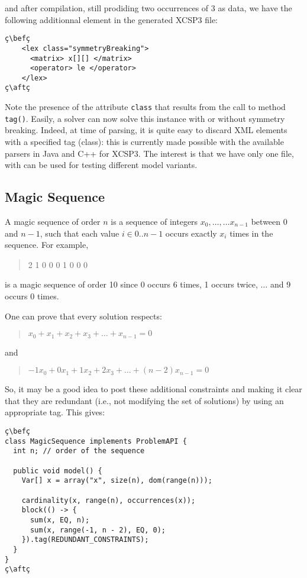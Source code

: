 \documentclass[10pt]{article}
\def\xt{{\rm XCSP3}\xspace}
\newcommand{\nn}[1]{{\tt #1}} %
\def\xt{{\rm XCSP3}\xspace}
\newenvironment{myvb}{\endgraf\small\verbatim}{\endverbatim}
\def\bef{\rule{10cm}{0.1mm}} %
\def\aft{\rule{10cm}{0.1mm}\medskip}
\begin{document}
and after compilation, still prodiding two occurrences of 3 as data, we have the following additionnal element in the generated \xt file:

\begin{lstlisting}
ç\befç
    <lex class="symmetryBreaking">
      <matrix> x[][] </matrix>
      <operator> le </operator>
    </lex>
ç\aftç
\end{lstlisting}


Note the presence of the attribute \nn{class} that results from the call to method \nn{tag()}.
Easily, a solver can now solve this instance with or without symmetry breaking.
Indeed, at time of parsing, it is quite easy to discard XML elements with a specified tag (class): this is currently made possible with the available parsers in Java and C++ for \xt.
The interest is that we have only one file, with can be used for testing different model variants. 


\subsection{Magic Sequence}

A magic sequence of order $n$ is a sequence of integers $x_0,\dots,…x_{n-1}$ between 0 and $n-1$, such that each value $i \in 0..n−1$ occurs exactly $x_i$ times in the sequence.
For example,
\begin{quote}
\begin{myvb}
  6 2 1 0 0 0 1 0 0 0
\end{myvb}
\end{quote}
is a magic sequence of order 10 since 0 occurs 6 times, 1 occurs twice, $\dots$ and 9 occurs 0 times.

One can prove that every solution respects:
\begin{quote}
  $x_0 + x_1 + x_2 + x_3 + \dots + x_{n-1} = 0$
\end{quote}
and
\begin{quote}
  $-1x_0 + 0x_1 + 1x_2 + 2x_3 + \dots + (n-2)x_{n-1} = 0$
\end{quote}

So, it may be a good idea to post these additional constraints  and making it clear that they are redundant (i.e., not modifying the set of solutions) by using an appropriate tag.
This gives:

\begin{lstlisting}
ç\befç
class MagicSequence implements ProblemAPI {
  int n; // order of the sequence

  public void model() {
    Var[] x = array("x", size(n), dom(range(n)));
    
    cardinality(x, range(n), occurrences(x));    
    block(() -> {
      sum(x, EQ, n);
      sum(x, range(-1, n - 2), EQ, 0);
    }).tag(REDUNDANT_CONSTRAINTS);
  }
}
ç\aftç
\end{lstlisting}
\end{document}

